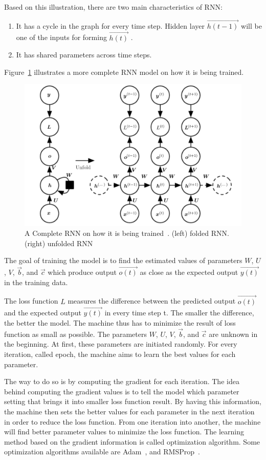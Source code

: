 Based on this illustration, there are two main characteristics of RNN:
\begin{enumerate}
	\item It has a cycle in the graph for every time step. Hidden layer $\vec{h(t-1)}$  will be one of the inputs for forming $\vec{h(t)}$ .
	\item It has shared parameters across time steps.
\end{enumerate}

Figure~\ref{fig:fulrnn} illustrates a more complete RNN model on how it is being trained.

\begin{figure}
	\centering
	\includegraphics[width=0.80\linewidth]{images/fullrnn}
	\caption{A Complete RNN on how it is being trained~\citep{Goodfellow-et-al-2016-Book}. (left) folded RNN. (right) unfolded RNN}
	\label{fig:fulrnn}
\end{figure}

The goal of training the model is to find the estimated values of parameters $W$, $U$, $V$, $\vec{b}$, and $\vec{c}$ which produce output $\vec{o(t)}$ as close as the expected output $\vec{y(t)}$ in the training data. 

The loss function $L$ measures the difference between the predicted output $\vec{o(t)}$ and the expected output $\vec{y(t)}$ in every time step t. The smaller the difference, the better the model. The machine thus has to minimize the result of loss function as small as possible. The parameters $W$, $U$, $V$, $\vec{b}$, and $\vec{c}$ are unknown in the beginning. At first, these parameters are initiated randomly. For every iteration, called epoch, the machine aims to learn the best values for each parameter.

The way to do so is by computing the gradient for each iteration. The idea behind computing the gradient values is to tell the model which parameter setting that brings it into smaller loss function result. By having this information, the machine then sets the better values for each parameter in the next iteration in order to reduce the loss function. From one iteration into another, the machine will find better parameter values to minimize the loss function. The learning method based on the gradient information is called optimization algorithm. Some optimization algorithms available are Adam~\citep{kingma2014adam}, and RMSProp~\citep{tieleman2012lecture}.


